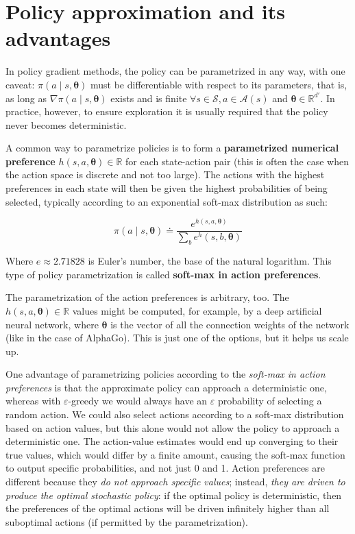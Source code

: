 \section{Policy approximation and its advantages}
In policy gradient methods, the policy can be parametrized in any way, with one caveat: $\pi \left( a \middle\vert s, \boldsymbol{\theta} \right)$ must be differentiable with respect to its parameters, that is, as long as $\nabla \pi \left( a \middle\vert s, \boldsymbol{\theta} \right)$ exists and is finite $\forall s \in \mathcal{S}, a \in \mathcal{A}(s)$ and $\boldsymbol{\theta} \in \mathbb{R}^{d'}$. In practice, however, to ensure exploration it is usually required that the policy never becomes deterministic.

A common way to parametrize policies is to form a \textbf{parametrized numerical preference} $h(s,a,\boldsymbol{\theta}) \in \mathbb{R}$ for each state-action pair (this is often the case when the action space is discrete and not too large). The actions with the highest preferences in each state will then be given the highest probabilities of being selected, typically according to an exponential soft-max distribution as such:

\begin{equation}
    \pi \left(a \middle\vert s, \boldsymbol{\theta} \right) \doteq \frac{e^{h(s,a,\boldsymbol{\theta})}}{\sum_{b} e^h(s,b,\boldsymbol{\theta})}
    \label{eq:ch8-softmaxinactionpreferencesparametrization}
\end{equation}

Where $e \approx 2.71828$ is Euler’s number, the base of the natural logarithm. This type of policy parametrization is called \textbf{soft-max in action preferences}.

The parametrization of the action preferences is arbitrary, too. The $h(s,a,\boldsymbol{\theta}) \in \mathbb{R}$ values might be computed, for example, by a deep artificial neural network, where $\boldsymbol{\theta}$ is the vector of all the connection weights of the network (like in the case of AlphaGo). This is just one of the options, but it helps us scale up.

One advantage of parametrizing policies according to the \textit{soft-max in action preferences} is that the approximate policy can approach a deterministic one, whereas with $\varepsilon$-greedy we would always have an $\varepsilon$ probability of selecting a random action. We could also select actions according to a soft-max distribution based on action values, but this alone would not allow the policy to approach a deterministic one. The action-value estimates would end up converging to their true values, which would differ by a finite amount, causing the soft-max function to output specific probabilities, and not just 0 and 1. Action preferences are different because they \textit{do not approach specific values}; instead, \textit{they are driven to produce the optimal stochastic policy}: if the optimal policy is deterministic, then the preferences of the optimal actions will be driven infinitely higher than all suboptimal actions (if permitted by the parametrization).

